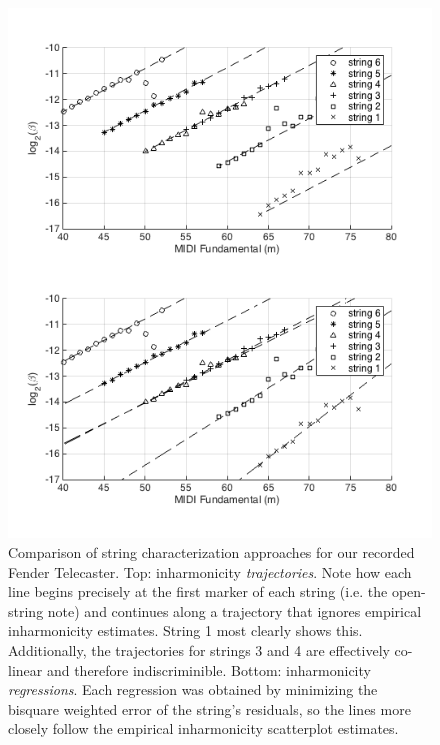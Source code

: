 \documentclass[12pt]{cmuthesis}
\begin{document}
\begin{figure}[!htbp] 
\label{fig:traj-v-reg}
\centering
\includegraphics[scale=0.75]{traj-v-reg}
\caption{Comparison of string characterization approaches for our recorded Fender Telecaster. Top: inharmonicity \textit{trajectories}. Note how each line begins precisely at the first marker of each string (i.e. the open-string note) and continues along a trajectory that ignores empirical inharmonicity estimates. String 1 most clearly shows this. Additionally, the trajectories for strings 3 and 4 are effectively co-linear and therefore indiscriminible. Bottom: inharmonicity \textit{regressions}. Each regression was obtained by minimizing the bisquare weighted error of the string's residuals, so the lines more closely follow the empirical inharmonicity scatterplot estimates.}
\end{figure}
\end{document}
